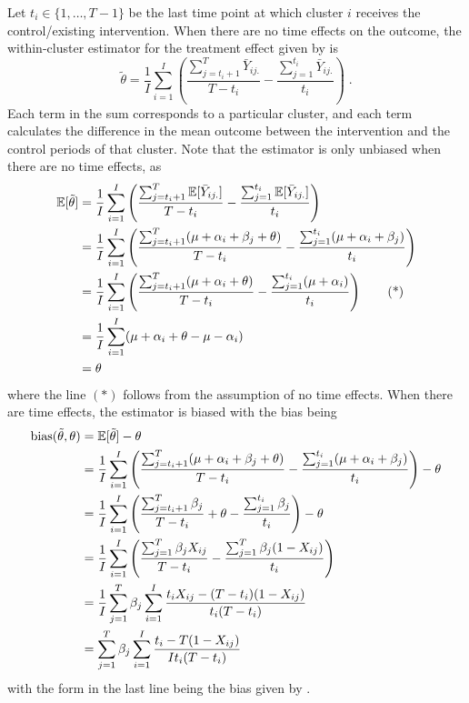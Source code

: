 \documentclass[10pt]{article}
\begin{document}
Let $t_i\in\{1,\ldots,T-1\}$ be the last time point at which cluster $i$ receives the control/existing intervention. When there are no time effects on the outcome, the within-cluster estimator for the treatment effect given by \textcite{Hussey:2007} is
\[
\tilde{\theta} = \frac{1}{I}\sum_{i=1}^I\left(\frac{\sum_{j=t_i+1}^T\bar{Y}_{ij.}}{T-t_i} - \frac{\sum_{j=1}^{t_i}\bar{Y}_{ij.}}{t_i}\right)\;.
\]
Each term in the sum corresponds to a particular cluster, and each term calculates the difference in the mean outcome between the intervention and the control periods of that cluster. Note that the estimator is only unbiased when there are no time effects, as
\begin{align*}
\mathbb{E}[\tilde{\theta}] &= \frac{1}{I}\sum_{i=1}^I\left(\frac{\sum_{j=t_i+1}^T\mathbb{E}[\bar{Y}_{ij.}]}{T-t_i} - \frac{\sum_{j=1}^{t_i}\mathbb{E}[\bar{Y}_{ij.}]}{t_i}\right) \\
&= \frac{1}{I}\sum_{i=1}^I\left(\frac{\sum_{j=t_i+1}^T(\mu+\alpha_i+\beta_j+\theta)}{T-t_i} - \frac{\sum_{j=1}^{t_i}(\mu+\alpha_i+\beta_j)}{t_i}\right) \\
&= \frac{1}{I}\sum_{i=1}^I\left(\frac{\sum_{j=t_i+1}^T(\mu+\alpha_i+\theta)}{T-t_i} - \frac{\sum_{j=1}^{t_i}(\mu+\alpha_i)}{t_i}\right) \tag{*} \\
&= \frac{1}{I}\sum_{i=1}^I(\mu+\alpha_i+\theta-\mu-\alpha_i) \\
&= \theta
\end{align*}
where the line $(*)$ follows from the assumption of no time effects. When there are time effects, the estimator is biased with the bias being
\begin{align*}
\mathrm{bias}(\tilde{\theta},\theta) &= \mathbb{E}[\tilde{\theta}] - \theta \\
&= \frac{1}{I}\sum_{i=1}^I\left(\frac{\sum_{j=t_i+1}^T(\mu+\alpha_i+\beta_j+\theta)}{T-t_i} - \frac{\sum_{j=1}^{t_i}(\mu+\alpha_i+\beta_j)}{t_i}\right) - \theta \\
&= \frac{1}{I}\sum_{i=1}^I\left(\frac{\sum_{j=t_i+1}^T\beta_j}{T-t_i} + \theta - \frac{\sum_{j=1}^{t_i}\beta_j}{t_i}\right) - \theta \\
&= \frac{1}{I}\sum_{i=1}^I\left(\frac{\sum_{j=1}^T\beta_jX_{ij}}{T-t_i} - \frac{\sum_{j=1}^T\beta_j(1-X_{ij})}{t_i}\right) \\
&= \frac{1}{I}\sum_{j=1}^T\beta_j\sum_{i=1}^I\frac{t_iX_{ij} - (T-t_i)(1-X_{ij})}{t_i(T-t_i)} \\
&= \sum_{j=1}^T\beta_j\sum_{i=1}^I\frac{t_i - T(1-X_{ij})}{It_i(T-t_i)}
\end{align*}
with the form in the last line being the bias given by \textcite{Hussey:2007}.
\end{document}
